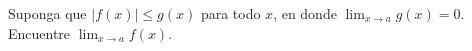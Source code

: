 \item Suponga que $|f(x)| \le g(x)$ para todo $x$, en donde $\lim_{x \to a} g(x) = 0$. Encuentre $\lim_{x \to a} f(x)$.

